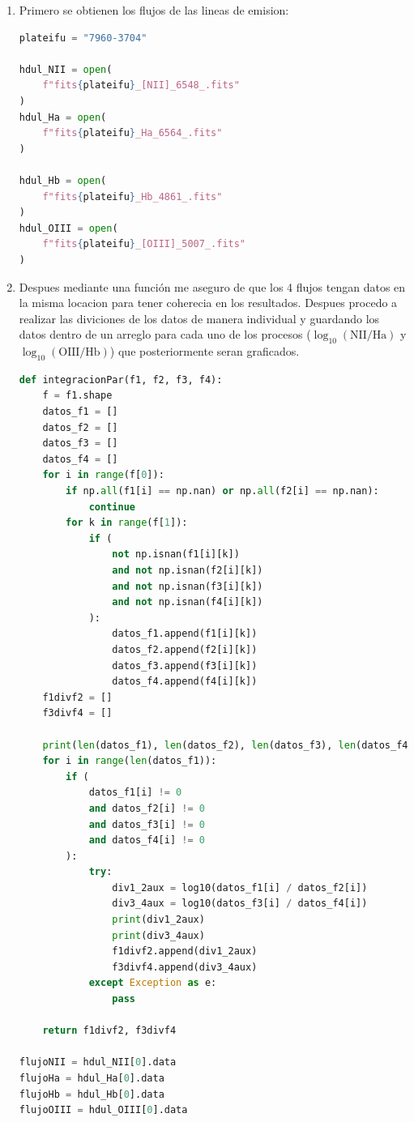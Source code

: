 \documentclass[10pt,twocolumn,a4paper]{opticajnl}
\begin{document}
\begin{enumerate}
  \item Primero se obtienen los flujos de las lineas de emision:
  \begin{lstlisting}[language=Python]
plateifu = "7960-3704"

hdul_NII = open(
    f"fits{plateifu}_[NII]_6548_.fits"
)
hdul_Ha = open(
    f"fits{plateifu}_Ha_6564_.fits"
)

hdul_Hb = open(
    f"fits{plateifu}_Hb_4861_.fits"
)
hdul_OIII = open(
    f"fits{plateifu}_[OIII]_5007_.fits"
)
  \end{lstlisting}
  \item Despues mediante una función me aseguro de que los 4 flujos tengan datos en la misma locacion para tener coherecia en los resultados. Despues procedo a realizar las diviciones de los datos de manera individual y guardando los datos dentro de un arreglo para cada uno de los procesos (\(\log_{10}(\text{NII}/\text{Ha})\) y \(\log_{10}(\text{OIII}/\text{Hb})\)) que posteriormente seran graficados.
  \begin{lstlisting}[language=Python]
def integracionPar(f1, f2, f3, f4):
    f = f1.shape
    datos_f1 = []
    datos_f2 = []
    datos_f3 = []
    datos_f4 = []
    for i in range(f[0]):
        if np.all(f1[i] == np.nan) or np.all(f2[i] == np.nan):
            continue
        for k in range(f[1]):
            if (
                not np.isnan(f1[i][k])
                and not np.isnan(f2[i][k])
                and not np.isnan(f3[i][k])
                and not np.isnan(f4[i][k])
            ):
                datos_f1.append(f1[i][k])
                datos_f2.append(f2[i][k])
                datos_f3.append(f3[i][k])
                datos_f4.append(f4[i][k])
    f1divf2 = []
    f3divf4 = []

    print(len(datos_f1), len(datos_f2), len(datos_f3), len(datos_f4))
    for i in range(len(datos_f1)):
        if (
            datos_f1[i] != 0
            and datos_f2[i] != 0
            and datos_f3[i] != 0
            and datos_f4[i] != 0
        ):
            try:
                div1_2aux = log10(datos_f1[i] / datos_f2[i])
                div3_4aux = log10(datos_f3[i] / datos_f4[i])
                print(div1_2aux)
                print(div3_4aux)
                f1divf2.append(div1_2aux)
                f3divf4.append(div3_4aux)
            except Exception as e:
                pass

    return f1divf2, f3divf4

flujoNII = hdul_NII[0].data
flujoHa = hdul_Ha[0].data
flujoHb = hdul_Hb[0].data
flujoOIII = hdul_OIII[0].data


\end{lstlisting}
\end{enumerate}
\end{document}
